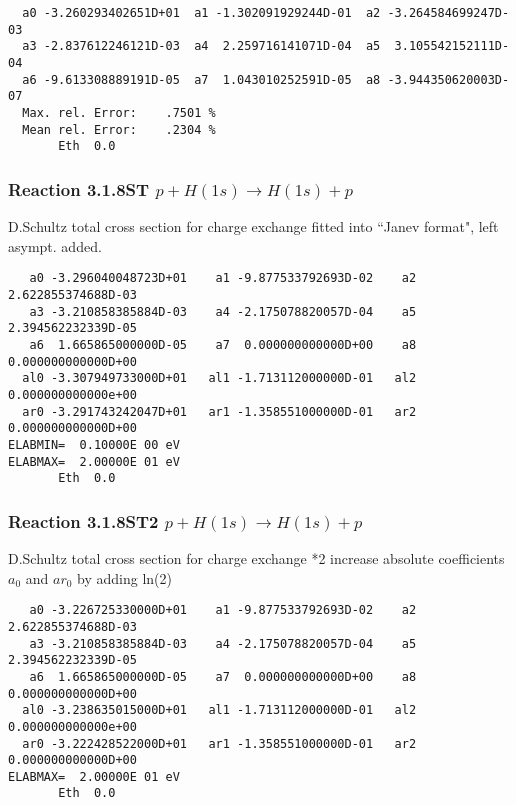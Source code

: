 \documentclass[12pt,dvipdfmx]{article}
\begin{document}
\begin{small}\begin{verbatim}
  a0 -3.260293402651D+01  a1 -1.302091929244D-01  a2 -3.264584699247D-03
  a3 -2.837612246121D-03  a4  2.259716141071D-04  a5  3.105542152111D-04
  a6 -9.613308889191D-05  a7  1.043010252591D-05  a8 -3.944350620003D-07
  Max. rel. Error:    .7501 %
  Mean rel. Error:    .2304 %
       Eth  0.0
\end{verbatim}\end{small}

\subsubsection{
Reaction 3.1.8ST $  p + H(1s) \rightarrow H(1s) + p  $
}
D.Schultz total cross section for charge exchange
fitted into ``Janev format", left asympt. added.


\begin{small}\begin{verbatim}
   a0 -3.296040048723D+01    a1 -9.877533792693D-02    a2  2.622855374688D-03
   a3 -3.210858385884D-03    a4 -2.175078820057D-04    a5  2.394562232339D-05
   a6  1.665865000000D-05    a7  0.000000000000D+00    a8  0.000000000000D+00
  al0 -3.307949733000D+01   al1 -1.713112000000D-01   al2  0.000000000000e+00
  ar0 -3.291743242047D+01   ar1 -1.358551000000D-01   ar2  0.000000000000D+00
ELABMIN=  0.10000E 00 eV
ELABMAX=  2.00000E 01 eV
       Eth  0.0
\end{verbatim}\end{small}

\subsubsection{
Reaction 3.1.8ST2 $  p + H(1s) \rightarrow H(1s) + p  $
}
D.Schultz total cross section for charge exchange *2
increase absolute coefficients $a_0$ and $ar_0$ by adding ln(2)

\begin{small}\begin{verbatim}
   a0 -3.226725330000D+01    a1 -9.877533792693D-02    a2  2.622855374688D-03
   a3 -3.210858385884D-03    a4 -2.175078820057D-04    a5  2.394562232339D-05
   a6  1.665865000000D-05    a7  0.000000000000D+00    a8  0.000000000000D+00
  al0 -3.238635015000D+01   al1 -1.713112000000D-01   al2  0.000000000000e+00
  ar0 -3.222428522000D+01   ar1 -1.358551000000D-01   ar2  0.000000000000D+00
ELABMAX=  2.00000E 01 eV
       Eth  0.0
\end{verbatim}\end{small}
\end{document}
